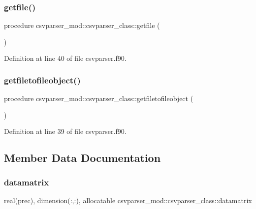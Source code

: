 \subsubsection{\texorpdfstring{getfile()}{getfile()}}
{\footnotesize\ttfamily procedure csvparser\+\_\+mod\+::csvparser\+\_\+class\+::getfile (\begin{DoxyParamCaption}{ }\end{DoxyParamCaption})\hspace{0.3cm}{\ttfamily [private]}}



Definition at line 40 of file csvparser.\+f90.

\mbox{\label{structcsvparser__mod_1_1csvparser__class_a9b0867325f70b9683aa558da0e5c6ddd}} 
\subsubsection{\texorpdfstring{getfiletofileobject()}{getfiletofileobject()}}
{\footnotesize\ttfamily procedure csvparser\+\_\+mod\+::csvparser\+\_\+class\+::getfiletofileobject (\begin{DoxyParamCaption}{ }\end{DoxyParamCaption})\hspace{0.3cm}{\ttfamily [private]}}



Definition at line 39 of file csvparser.\+f90.



\subsection{Member Data Documentation}
\mbox{\label{structcsvparser__mod_1_1csvparser__class_afb06725049484011f39d9183adc9d192}} 
\subsubsection{\texorpdfstring{datamatrix}{datamatrix}}
{\footnotesize\ttfamily real(prec), dimension(\+:,\+:), allocatable csvparser\+\_\+mod\+::csvparser\+\_\+class\+::datamatrix\hspace{0.3cm}{\ttfamily [private]}}




